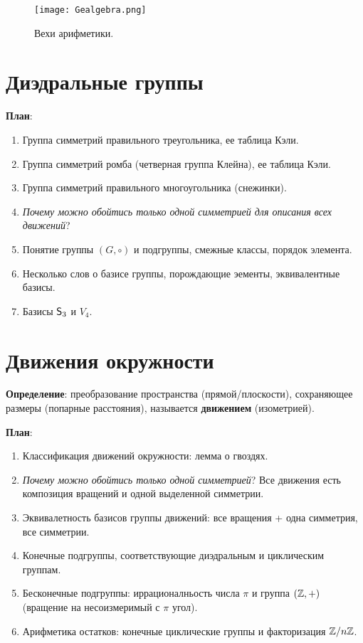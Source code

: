 
\begin{figure}[htb!]
\begin{center}
\texttt{[image: Gealgebra.png]}
\end{center}
\caption{Вехи арифметики.}\label{ariphmetics}
\end{figure}

\section{Диэдральные группы}


\textbf{План}:
\begin{enumerate}
\item Группа симметрий правильного треугольника, ее таблица Кэли.
\item Группа симметрий ромба (четверная группа Клейна), ее таблица Кэли.
\item Группа симметрий правильного многоугольника (снежинки).
\item \textit{Почему можно обойтись только одной симметрией для описания всех движений}?
\item Понятие группы $(G,\circ)$ и подгруппы, смежные классы, порядок элемента.
\item Несколько слов о базисе группы, порождающие эементы, эквивалентные базисы.
\item Базисы ${\mathsf{S}}_3$ и $V_4$.
\end{enumerate}



\section{Движения окружности}
 

\textbf{Определение}: преобразование пространства (прямой/плоскости), сохраняющее размеры (попарные расстояния), называется \textbf{движением} (изометрией).

\textbf{План}:
\begin{enumerate}
\item Классификация движений окружности: лемма о гвоздях.
\item \textit{Почему можно обойтись только одной симметрией}? Все движения есть композиция вращений и одной выделенной симметрии.
\item Эквивалетность базисов группы движений: все вращения + одна симметрия, все симметрии.
\item Конечные подгруппы, соответствующие диэдральным и циклическим группам.
\item Бесконечные подгруппы: иррационалньость числа $\pi$ и группа $(\mathbb Z,+)$ (вращение на несоизмеримый с $\pi$ угол).
\item Арифметика остатков: конечные циклические группы и факторизация $\mathbb Z/n\mathbb Z$.
\end{enumerate}



